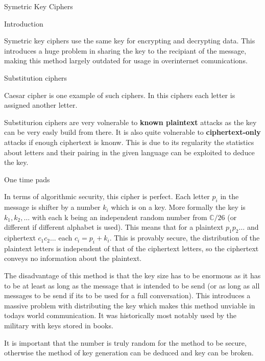 \documentclass[12pt, letterpaper]{article}
\begin{document}
\begin{section}{Symetric Key Ciphers}

  \begin{subsection}{Introduction}

    Symetric key ciphers use the same key for encrypting and decrypting data.
    This introduces a huge problem in sharing the key to the recipiant of the
    message, making this method largely outdated for usage in overinternet
    comunications.

  \end{subsection}

  \begin{subsection}{Substitution ciphers}

    Caesar cipher is one example of such ciphers. In this ciphers each letter is
    assigned another letter.

    Substiturion ciphers are very volnerable to \textbf{known plaintext} attacks
    as the key can be very easly build from there. It is also quite volnerable
    to \textbf{ciphertext-only} attacks if enough ciphertext is knonw. This is
    due to its regularity the statistics about letters and their pairing in the
    given language can be exploited to deduce the key.

  \end{subsection}

  \begin{subsection}{One time pads}

    In terms of algorithmic security, this cipher is perfect. Each letter
    \(p_{i}\) in the message is shifter by a number \(k_{i}\) which is on a key.
    More formally the key is \(k_{1}, k_{2}, \dots\) with each k being an
    independent random number from \(\mathbb{C}/26\) (or different if different
    alphabet is used). This means that for a plaintext \(p_{1}p_{2} \dots\) and
    ciphertext \(c_{1}c_{2} \dots\) each \(c_{i} = p_{i} + k_{i}\). This is
    provably secure, the distribution of the plaintext letters is independent of
    that of the ciphertext letters, so the ciphertext conveys no information
    about the plaintext.

    The disadvantage of this method is that the key size has to be enormous as
    it has to be at least as long as the message that is intended to be send (or
    as long as all messages to be send if its to be used for a full
    conversation). This introduces a massive problem with distributing the key
    which makes this method unviable in todays world communication. It was
    historically most notably used by the military with keys stored in books.

    It is important that the number is truly random for the method to be secure,
    otherwise the method of key generation can be deduced and key can be broken.

  \end{subsection}

\end{section}
\end{document}
